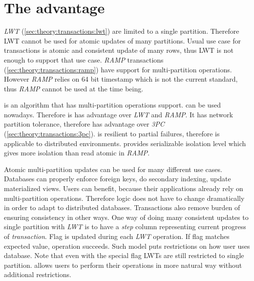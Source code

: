 
\section{The advantage}
\emph{LWT} (\ref{sec:theory:transactions:lwt}) are limited to a single partition. Therefore LWT cannot be used for atomic updates of many partitions. Usual use case for transactions is atomic and consistent update of many rows, thus LWT is not enough to support that use case. \emph{RAMP} transactions (\ref{sec:theory:transactions:ramp}) have support for multi-partition operations. 
However \emph{RAMP} relies on 64 bit timestamp which is not the current standard, thus \emph{RAMP} cannot be used at the time being.



\mpp is an algorithm that has multi-partition operations support. \mpp can be used nowadays. Therefore is has advantage over \emph{LWT} and \emph{RAMP}. It has network partition tolerance, therefore has advantage over \emph{3PC} (\ref{sec:theory:transactions:3pc}).
\mpp is resilient to partial failures, therefore is applicable to distributed environments. \mpp provides serializable isolation level which gives more isolation than read atomic in \emph{RAMP}.

Atomic multi-partition updates can be used for many different use cases. Databases can properly enforce foreign keys, do secondary indexing, update materialized views. Users can benefit, because their applications already rely on multi-partition operations. Therefore logic does not have to change dramatically in order to adapt to distributed databases. Transactions also remove burden of ensuring consistency in other ways. One way of doing many consistent updates to single partition with \emph{LWT} is to have a \emph{step} column representing current progress of \emph{transaction}. Flag is updated during each \emph{LWT} operation. If flag matches expected value, operation succeeds. Such model puts restrictions on how user uses database. Note that even with the special flag LWTs are still restricted to single partition. \mpp allows users to perform their operations in more natural way without additional restrictions. 

